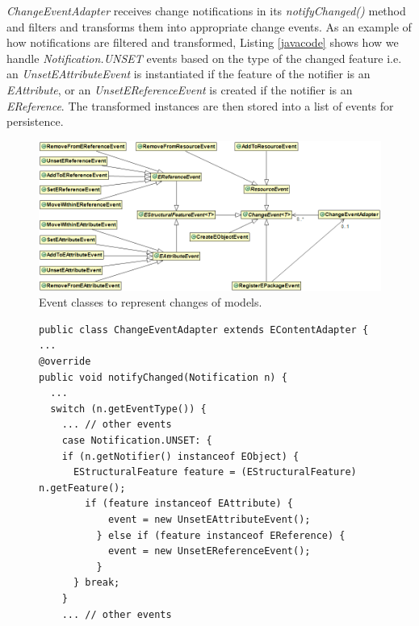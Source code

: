 \documentclass{llncs}
\begin{document}
\emph{ChangeEventAdapter} receives change notifications in its \emph{notifyChanged()} method and filters and transforms them into appropriate change events. As an example of how notifications are filtered and transformed, Listing \ref{javacode} shows how we handle \emph{Notification.UNSET} events based on the type of the changed feature i.e. an \emph{UnsetEAttributeEvent} is instantiated if the feature of the notifier is an \emph{EAttribute}, or an \emph{UnsetEReferenceEvent}  is created if the notifier is an \emph{EReference}. The transformed instances are then stored into a list of events for persistence. 

\begin{figure}[t!]
\centering
\includegraphics[width=\linewidth]{events}
\caption{Event classes to represent changes of models. }
\label{events}
\end{figure}

\begin{figure}[t!]
\begin{lstlisting}[style=java,caption={Simplified Java code to handle notification events.},label=javacode]
public class ChangeEventAdapter extends EContentAdapter {
...
@override
public void notifyChanged(Notification n) {
  ...
  switch (n.getEventType()) {
    ... // other events
    case Notification.UNSET: {
    if (n.getNotifier() instanceof EObject) {
      EStructuralFeature feature = (EStructuralFeature) n.getFeature();
        if (feature instanceof EAttribute) {
            event = new UnsetEAttributeEvent();
          } else if (feature instanceof EReference) {
            event = new UnsetEReferenceEvent();
          }
      } break;
    } 
    ... // other events
\end{lstlisting}	
\end{figure}
\end{document}
